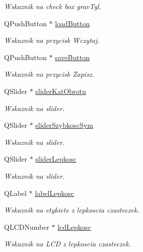 \begin{DoxyCompactItemize}
\begin{DoxyCompactList}\small\item\em Wskaznik na check box grav\-Tgl. \end{DoxyCompactList}\item 
Q\-Push\-Button $\ast$ \hyperlink{class_okno_glowne_accbadc3bc4d418cfe1bce2be61881917}{load\-Button}
\begin{DoxyCompactList}\small\item\em Wskaznik na przycisk Wczytaj. \end{DoxyCompactList}\item 
Q\-Push\-Button $\ast$ \hyperlink{class_okno_glowne_a81e6650fa592f04bf0adc3bebd3346d6}{save\-Button}
\begin{DoxyCompactList}\small\item\em Wskaznik na przycisk Zapisz. \end{DoxyCompactList}\item 
Q\-Slider $\ast$ \hyperlink{class_okno_glowne_aaee43ea7074cff126b069c60657d698d}{slider\-Kat\-Obrotu}
\begin{DoxyCompactList}\small\item\em Wskaznik na slider. \end{DoxyCompactList}\item 
Q\-Slider $\ast$ \hyperlink{class_okno_glowne_a85328893065393400d5a0344004ca78b}{slider\-Szybkosc\-Sym}
\begin{DoxyCompactList}\small\item\em Wskaznik na slider. \end{DoxyCompactList}\item 
Q\-Slider $\ast$ \hyperlink{class_okno_glowne_ae2f07f3f6c3f8286a943b42860299072}{slider\-Lepkosc}
\begin{DoxyCompactList}\small\item\em Wskaznik na slider. \end{DoxyCompactList}\item 
Q\-Label $\ast$ \hyperlink{class_okno_glowne_ae46bf7cd60af2ead74dc27ee7d761868}{label\-Lepkosc}
\begin{DoxyCompactList}\small\item\em Wskaznik na etykiete z lepkoscia czasteczek. \end{DoxyCompactList}\item 
Q\-L\-C\-D\-Number $\ast$ \hyperlink{class_okno_glowne_ad279372aa7de9f411ca30749bb587e3c}{lcd\-Lepkosc}
\begin{DoxyCompactList}\small\item\em Wskaznik na L\-C\-D z lepkoscia czasteczek. \end{DoxyCompactList}\item 

\end{DoxyCompactItemize}
